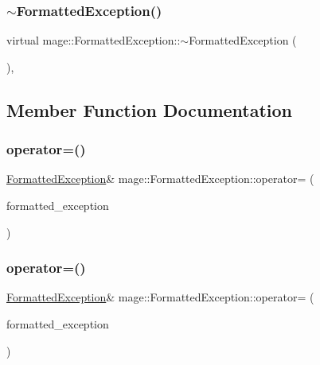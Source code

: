 \subsubsection{\texorpdfstring{$\sim$\+Formatted\+Exception()}{~FormattedException()}}
{\footnotesize\ttfamily virtual mage\+::\+Formatted\+Exception\+::$\sim$\+Formatted\+Exception (\begin{DoxyParamCaption}{ }\end{DoxyParamCaption})\hspace{0.3cm}{\ttfamily [virtual]}, {\ttfamily [default]}}



\subsection{Member Function Documentation}
\hypertarget{structmage_1_1_formatted_exception_a36b95a1d6ee656db750f9f7c24a0f69d}{}\label{structmage_1_1_formatted_exception_a36b95a1d6ee656db750f9f7c24a0f69d} 
\subsubsection{\texorpdfstring{operator=()}{operator=()}\hspace{0.1cm}{\footnotesize\ttfamily [1/2]}}
{\footnotesize\ttfamily \hyperlink{structmage_1_1_formatted_exception}{Formatted\+Exception}\& mage\+::\+Formatted\+Exception\+::operator= (\begin{DoxyParamCaption}\item[{const \hyperlink{structmage_1_1_formatted_exception}{Formatted\+Exception} \&}]{formatted\+\_\+exception }\end{DoxyParamCaption})\hspace{0.3cm}{\ttfamily [default]}}

\hypertarget{structmage_1_1_formatted_exception_ae35ad9e81efe8ed385792854036b4a14}{}\label{structmage_1_1_formatted_exception_ae35ad9e81efe8ed385792854036b4a14} 
\subsubsection{\texorpdfstring{operator=()}{operator=()}\hspace{0.1cm}{\footnotesize\ttfamily [2/2]}}
{\footnotesize\ttfamily \hyperlink{structmage_1_1_formatted_exception}{Formatted\+Exception}\& mage\+::\+Formatted\+Exception\+::operator= (\begin{DoxyParamCaption}\item[{\hyperlink{structmage_1_1_formatted_exception}{Formatted\+Exception} \&\&}]{formatted\+\_\+exception }\end{DoxyParamCaption})\hspace{0.3cm}{\ttfamily [default]}}

